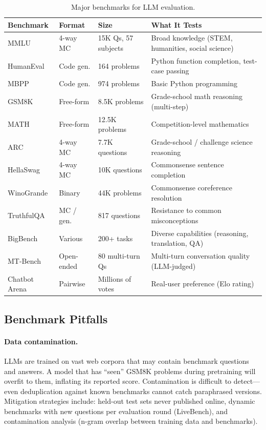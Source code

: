 \begin{table}[H]
\centering
\caption{Major benchmarks for LLM evaluation.}
\label{tab:benchmarks}
\begin{tabularx}{\textwidth}{@{}l l l X@{}}
\toprule
\textbf{Benchmark} & \textbf{Format} & \textbf{Size} & \textbf{What It Tests} \\
\midrule
MMLU         & 4-way MC   & 15K Qs, 57 subjects & Broad knowledge (STEM, humanities, social science) \\
HumanEval    & Code gen.  & 164 problems         & Python function completion, test-case passing \\
MBPP         & Code gen.  & 974 problems          & Basic Python programming \\
GSM8K        & Free-form  & 8.5K problems         & Grade-school math reasoning (multi-step) \\
MATH         & Free-form  & 12.5K problems        & Competition-level mathematics \\
ARC          & 4-way MC   & 7.7K questions        & Grade-school / challenge science reasoning \\
HellaSwag    & 4-way MC   & 10K questions         & Commonsense sentence completion \\
WinoGrande   & Binary     & 44K problems          & Commonsense coreference resolution \\
TruthfulQA   & MC / gen.  & 817 questions         & Resistance to common misconceptions \\
BigBench     & Various    & 200+ tasks            & Diverse capabilities (reasoning, translation, QA) \\
MT-Bench     & Open-ended & 80 multi-turn Qs      & Multi-turn conversation quality (LLM-judged) \\
Chatbot Arena & Pairwise  & Millions of votes     & Real-user preference (Elo rating) \\
\bottomrule
\end{tabularx}
\end{table}

\subsection{Benchmark Pitfalls}

\paragraph{Data contamination.}
LLMs are trained on vast web corpora that may contain benchmark questions and
answers.  A model that has ``seen'' GSM8K problems during pretraining will
overfit to them, inflating its reported score.  Contamination is difficult to
detect---even deduplication against known benchmarks cannot catch paraphrased
versions.  Mitigation strategies include: held-out test sets never published
online, dynamic benchmarks with new questions per evaluation round (LiveBench),
and contamination analysis (n-gram overlap between training data and benchmarks).

